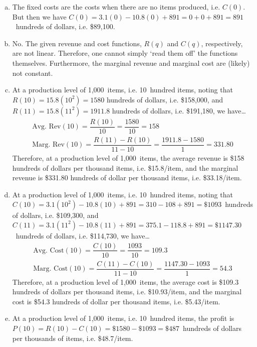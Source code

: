 \documentclass[11pt,letterpaper]{article}
\begin{document}
\sol
\begin{enumerate}[(a)]
\item The fixed costs are the costs when there are no items produced, i.e. $C(0)$. But then we have $C(0)= 3.1(0) - 10.8(0) + 891= 0 + 0 + 891= 891$~hundreds of dollars, i.e. \$89,100.

\item No. The given revenue and cost functions, $R(q)$ and $C(q)$, respectively, are not linear. Therefore, one cannot simply `read them off' the functions themselves. Furthermore, the marginal revenue and marginal cost are (likely) not constant. 

\item At a production level of 1,000~items, i.e. 10~hundred items, noting that $R(10)= 15.8(10^2)= 1580$ hundreds of dollars, i.e. \$158,000, and $R(11)= 15.8(11^2)= 1911.8$ hundreds of dollars, i.e. \$191,180, we have\dots
	\[
	\begin{aligned}
	\text{Avg. Rev}(10)= \dfrac{R(10)}{10}= \dfrac{1580}{10}= 158 \\[0.3cm]
	\text{Marg. Rev}(10)= \dfrac{R(11) - R(10)}{11 - 10}= \dfrac{1911.8 - 1580}{1}= 331.80
	\end{aligned}
	\] 
Therefore, at a production level of 1,000~items, the average revenue is \$158 hundreds of dollars per thousand items, i.e. \$15.8/item, and the marginal revenue is \$331.80 hundreds of dollar per thousand items, i.e. \$33.18/item.


\item At a production level of 1,000~items, i.e. 10~hundred items, noting that $C(10)= 3.1(10^2) - 10.8(10) + 891=  310 - 108 + 891= \$1093$~hundreds of dollars, i.e. \$109,300, and $C(11)= 3.1(11^2) - 10.8(11) + 891=  375.1 - 118.8 + 891= \$1147.30$~hundreds of dollars, i.e. \$114,730, we have\dots
	\[
	\begin{aligned}
	\text{Avg. Cost}(10)= \dfrac{C(10)}{10}= \dfrac{1093}{10}= 109.3 \\[0.3cm]
	\text{Marg. Cost}(10)= \dfrac{C(11) - C(10)}{11 - 10}= \dfrac{1147.30 - 1093}{1}= 54.3
	\end{aligned}
	\] 
Therefore, at a production level of 1,000~items, the average cost is \$109.3 hundreds of dollars per thousand items, i.e. \$10.93/item, and the marginal cost is \$54.3 hundreds of dollar per thousand items, i.e. \$5.43/item.
 
\item At a production level of 1,000~items, i.e. 10~hundred items, the profit is $P(10)= R(10) - C(10)= \$1580 - \$1093= \$487$~hundreds of dollars per thousands of items, i.e. \$48.7/item.
\end{enumerate}
\end{document}
